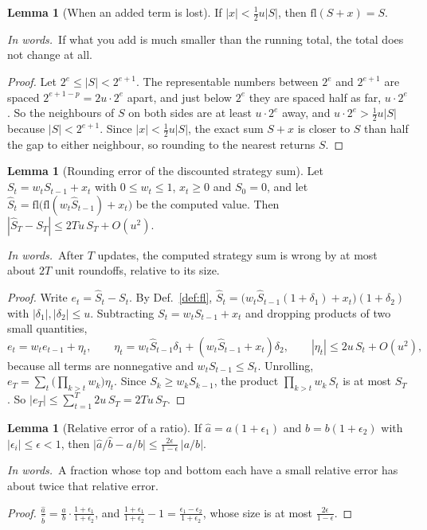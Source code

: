 \documentclass[11pt]{article}
\theoremstyle{definition}
\newtheorem{lemma}[definition]{Lemma}
\newcommand{\inwords}{\par\smallskip\noindent\textit{In words.}\ }
\newcommand{\Def}[1]{Def.~\ref{#1}}\newcommand{\Lem}[1]{Lemma~\ref{#1}}\newcommand{\Thm}[1]{Thm.~\ref{#1}}
\begin{document}
\begin{lemma}[When an added term is lost]\label{lem:lost}
If $|x|<\tfrac12u|S|$, then $\mathrm{fl}(S+x)=S$.
\inwords If what you add is much smaller than the running total, the total does not change at all.
\end{lemma}
\begin{proof}
Let $2^e\le|S|<2^{e+1}$. The representable numbers between $2^e$ and $2^{e+1}$ are spaced $2^{e+1-p}=2u\cdot2^e$ apart, and just
below $2^e$ they are spaced half as far, $u\cdot2^e$. So the neighbours of $S$ on both sides are at least $u\cdot2^e$ away, and
$u\cdot2^e>\tfrac12u|S|$ because $|S|<2^{e+1}$. Since $|x|<\tfrac12u|S|$, the exact sum $S+x$ is closer to $S$ than half the gap to
either neighbour, so rounding to the nearest returns $S$.
\end{proof}

\begin{lemma}[Rounding error of the discounted strategy sum]\label{lem:sumerr}
Let $S_t=w_tS_{t-1}+x_t$ with $0\le w_t\le1$, $x_t\ge0$ and $S_0=0$, and let $\hat S_t=\mathrm{fl}\big(\mathrm{fl}(w_t\hat S_{t-1})+x_t\big)$ be the computed
value. Then $|\hat S_T-S_T|\le2Tu\,S_T+O(u^2)$.
\inwords After $T$ updates, the computed strategy sum is wrong by at most about $2T$ unit roundoffs, relative to its size.
\end{lemma}
\begin{proof}
Write $e_t=\hat S_t-S_t$. By \Def{def:fl}, $\hat S_t=\big(w_t\hat S_{t-1}(1+\delta_1)+x_t\big)(1+\delta_2)$ with $|\delta_1|,|\delta_2|\le u$. Subtracting
$S_t=w_tS_{t-1}+x_t$ and dropping products of two small quantities,
\[ e_t=w_te_{t-1}+\eta_t,\qquad \eta_t=w_t\hat S_{t-1}\delta_1+(w_t\hat S_{t-1}+x_t)\delta_2,\qquad|\eta_t|\le2u\,S_t+O(u^2), \]
because all terms are nonnegative and $w_tS_{t-1}\le S_t$. Unrolling, $e_T=\sum_t\big(\prod_{k>t}w_k\big)\eta_t$. Since
$S_k\ge w_kS_{k-1}$, the product $\prod_{k>t}w_k\,S_t$ is at most $S_T$. So $|e_T|\le\sum_{t=1}^T2u\,S_T=2Tu\,S_T$.
\end{proof}

\begin{lemma}[Relative error of a ratio]\label{lem:ratio}
If $\hat a=a(1+\epsilon_1)$ and $\hat b=b(1+\epsilon_2)$ with $|\epsilon_i|\le\epsilon<1$, then $\big|\hat a/\hat b-a/b\big|\le\frac{2\epsilon}{1-\epsilon}\,|a/b|$.
\inwords A fraction whose top and bottom each have a small relative error has about twice that relative error.
\end{lemma}
\begin{proof}
$\frac{\hat a}{\hat b}=\frac ab\cdot\frac{1+\epsilon_1}{1+\epsilon_2}$, and $\frac{1+\epsilon_1}{1+\epsilon_2}-1=\frac{\epsilon_1-\epsilon_2}{1+\epsilon_2}$, whose size is at most $\frac{2\epsilon}{1-\epsilon}$.
\end{proof}
\end{document}
